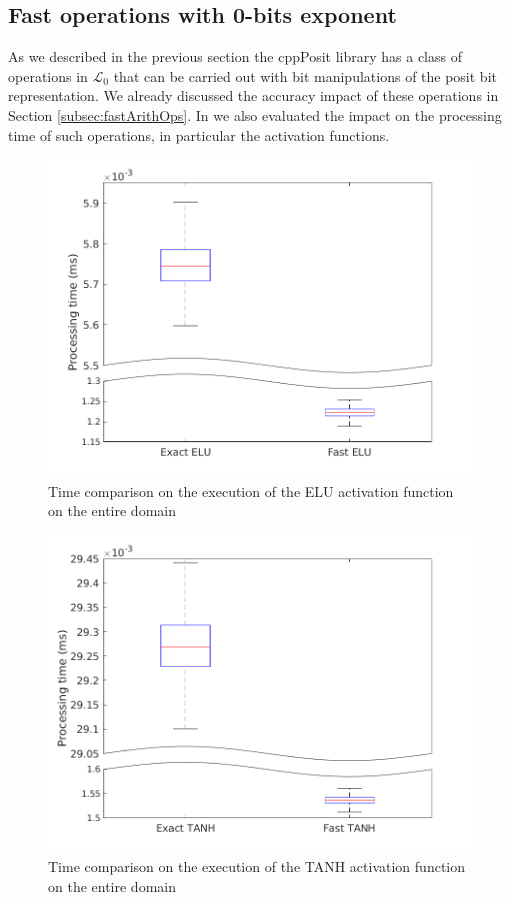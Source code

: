 \subsection{Fast operations with 0-bits exponent}

As we described in the previous section the cppPosit library has a class of operations in $\mathcal{L}_0$ that can be carried out with bit manipulations of the posit bit representation. We already discussed the accuracy impact of these operations in Section \ref{subsec:fastArithOps}. In \cite{coco_et_al_jrtip_2020, coco2020sensors} we also evaluated the impact on the processing time of such operations, in particular the activation functions.

\begin{figure}
    \centering
\includegraphics[width=\linewidth]{img/eluTimeComparison.png}
    \caption{Time comparison on the execution of the ELU activation function on the entire  domain}
    \label{fig:posit80EluTimeComparison}
\end{figure}

\begin{figure}
    \centering
\includegraphics[width=\linewidth]{img/tanhTimeComparison.png}
    \caption{Time comparison on the execution of the TANH activation function on the entire  domain}
    \label{fig:posit80ETanhTimeComparison}
\end{figure}

